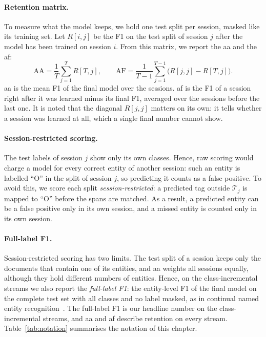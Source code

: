 \paragraph{Retention matrix.} To measure what the model keeps, we hold one test split per
session, masked like its training set. Let $R[i,j]$ be the F1 on the test split of session
$j$ after the model has been trained on session $i$. From this matrix, we report the
\gls{aa} and the \gls{af}:
\begin{equation}
  \mathrm{AA}=\frac{1}{T}\sum_{j=1}^{T}R[T,j],\qquad
  \mathrm{AF}=\frac{1}{T-1}\sum_{j=1}^{T-1}\big(R[j,j]-R[T,j]\big).
  \label{eq:aa-af}
\end{equation}
\gls{aa} is the mean F1 of the final model over the sessions. \gls{af} is the F1 of a session
right after it was learned minus its final F1, averaged over the sessions before the last
one. It is noted that the diagonal $R[j,j]$ matters on its own: it tells whether a session
was learned at all, which a single final number cannot show.

\paragraph{Session-restricted scoring.} The test labels of session $j$ show only its own
classes. Hence, raw scoring would charge a model for every correct entity of another
session: such an entity is labelled ``O'' in the split of session $j$, so predicting it
counts as a false positive. To avoid this, we score each split \emph{session-restricted}: a
predicted tag outside $\mathcal{T}_j$ is mapped to ``O'' before the spans are matched. As a
result, a predicted entity can be a false positive only in its own session, and a missed
entity is counted only in its own session.

\paragraph{Full-label F1.} Session-restricted scoring has two limits. The test split of a
session keeps only the documents that contain one of its entities, and \gls{aa} weights all
sessions equally, although they hold different numbers of entities. Hence, on the
class-incremental streams we also report the \emph{full-label F1}: the entity-level F1 of
the final model on the complete test set with all classes and no label masked, as in
continual named entity recognition~\citep{ma2023learning}. The full-label F1 is our headline
number on the class-incremental streams, and \gls{aa} and \gls{af} describe retention on
every stream. Table~\ref{tab:notation} summarises the notation of this chapter.

